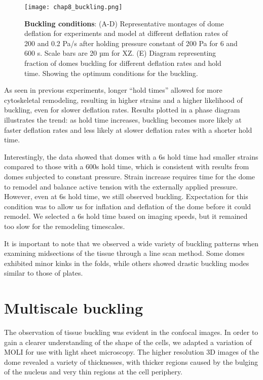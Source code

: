 \begin{figure}[h]
	\centering
	\texttt{[image: chap8\_buckling.png]}
	\caption{\label{fig_8_3} \textbf{Buckling conditions}: (A-D) Representative montages of dome deflation for experiments and model at different deflation rates of 200 and 0.2 Pa/s after holding pressure constant of 200 Pa for 6 and 600 s. Scale bars are 20 µm for XZ. (E) Diagram representing fraction of domes buckling for different deflation rates and hold time. Showing the optimum conditions for the buckling.
	}
\end{figure}

As seen in previous experiments, longer ``hold times'' allowed for more
cytoskeletal remodeling, resulting in higher strains and a higher
likelihood of buckling, even for slower deflation rates. Results plotted
in a phase diagram illustrates the trend: as hold time increases,
buckling becomes more likely at faster deflation rates and less likely
at slower deflation rates with a shorter hold time.


Interestingly, the data showed that domes with a 6s hold time had
smaller strains compared to those with a 600s hold time, which is
consistent with results from domes subjected to constant pressure.
Strain increase requires time for the dome to remodel and balance active
tension with the externally applied pressure. However, even at 6s hold
time, we still observed buckling. Expectation for this condition was to
allow us for inflation and deflation of the dome before it could
remodel. We selected a 6s hold time based on imaging speeds, but it
remained too slow for the remodeling timescales.

It is important to note that we observed a wide variety of buckling
patterns when examining midsections of the tissue through a line scan
method. Some domes exhibited minor kinks in the folds, while others
showed drastic buckling modes similar to those of plates.



\hypertarget{multiscale-buckling}{%
	\section{Multiscale buckling}\label{multiscale-buckling}}

The observation of tissue buckling was evident in the confocal images.
In order to gain a clearer understanding of the shape of the cells, we
adapted a variation of MOLI for use with light sheet microscopy. The
higher resolution 3D images of the dome revealed a variety of
thicknesses, with thicker regions caused by the bulging of the nucleus
and very thin regions at the cell periphery.

